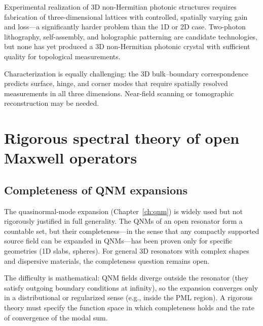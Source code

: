 Experimental realization of 3D non-Hermitian photonic structures requires
fabrication of three-dimensional lattices with controlled, spatially
varying gain and loss---a significantly harder problem than the 1D or 2D
case. Two-photon lithography, self-assembly, and holographic patterning
are candidate technologies, but none has yet produced a 3D non-Hermitian
photonic crystal with sufficient quality for topological measurements.

Characterization is equally challenging: the 3D bulk--boundary
correspondence predicts surface, hinge, and corner modes that require
spatially resolved measurements in all three dimensions. Near-field
scanning or tomographic reconstruction may be needed.


\section{Rigorous spectral theory of open Maxwell operators}
\label{sec:spectral-theory}

\subsection{Completeness of QNM expansions}
\label{ssec:qnm-completeness-open}

The quasinormal-mode expansion (Chapter~\ref{ch:qnm}) is widely used but
not rigorously justified in full generality. The QNMs of an open
resonator form a countable set, but their completeness---in the sense
that any compactly supported source field can be expanded in QNMs---has
been proven only for specific geometries (1D slabs, spheres). For
general 3D resonators with complex shapes and dispersive materials, the
completeness question remains open.

The difficulty is mathematical: QNM fields diverge outside the
resonator (they satisfy outgoing boundary conditions at infinity), so
the expansion converges only in a distributional or regularized sense
(e.g., inside the PML region). A rigorous theory must specify the
function space in which completeness holds and the rate of convergence
of the modal sum.

